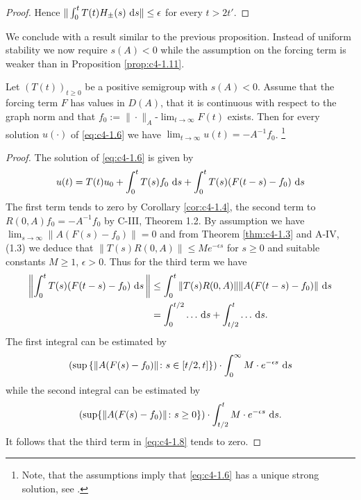 \begin{proof}
Hence $\|\int_{0}^{t} T(t)H_{\pm}(s) \, \mathop{}\!\mathrm{d}{s}\| \leq \epsilon$ for every $t > 2t'$.
\end{proof}

We conclude with a result similar to the previous proposition.
Instead of uniform stability we now require $s(A) < 0$ while the assumption on the forcing term is weaker than in Proposition \ref{prop:c4-1.11}.

\begin{proposition}\label{prop:c4-1.12}
%
%
%
Let $(T(t))_{t \geq 0}$ be a positive semigroup with $s(A) < 0$.
Assume that the forcing term $F$ has values in $D(A)$, that it is continuous with respect to the graph norm and that $f_{0} := \|\cdot\|_{A}$-$\lim_{t \to \infty} F(t)$ exists.
Then for every solution $u(\cdot)$ of \eqref{eq:c4-1.6} we have $\lim_{t \to \infty} u(t) = -A^{-1}f_{0}$.
\footnote{Note, that the assumptions imply that \eqref{eq:c4-1.6} has a unique strong solution, see \citet[ Theorem~4.2.4]{pazy:1983}.}
\end{proposition}
\begin{proof}
The solution of \eqref{eq:c4-1.6} is given by
\begin{equation}\label{eq:c4-1.8}
u(t) = T(t)u_{0} + \int_{0}^{t} T(s)f_{0} \, \mathop{}\!\mathrm{d}{s} + \int_{0}^{t} T(s)(F(t-s)-f_{0}) \, \mathop{}\!\mathrm{d}{s}
\end{equation}
The first term tends to zero by Corollary \ref{cor:c4-1.4},  
the second term to $R(0,A)f_{0} = -A^{-1}f_{0}$ by C-III, Theorem 1.2.
By assumption we have $\lim_{s \to \infty}\|A(F(s)-f_{0})\| = 0$ and from Theorem \ref{thm:c4-1.3} and A-IV, (1.3) we deduce that $\|T(s)R(0,A)\| \leq Me^{-\epsilon s}$ for $s \geq 0$ and suitable constants $M \geq 1$, $\epsilon > 0$.
Thus for the third term we have
\begin{align*}
 \left\|\int_{0}^{t} T(s)(F(t-s)-f_{0}) \, \mathop{}\!\mathrm{d}{s}\,\right\| &\leq \int_{0}^{t} \|T(s)R(0,A)\| \|A(F(t-s)-f_{0})\| \, \mathop{}\!\mathrm{d}{s} \\
&= \int_{0}^{t/2} \ldots \, \mathop{}\!\mathrm{d}{s} + \int_{t/2}^{t} \ldots \, \mathop{}\!\mathrm{d}{s}.
\end{align*}
The first integral can be estimated by
\[
 \left(\sup  \left\{\|A(F(s)-f_{0})\| \colon s \in 
 \left[ t/2 , t \right] \right\} \right) 
\cdot \int_{0}^{\infty} M \cdot e^{-\epsilon s} \, \mathop{}\!\mathrm{d}{s}
\]
while the second integral can be estimated by 
\[
 \left(\sup\{\|A(F(s)-f_{0})\| \colon s \geq 0\}\right)
\cdot \int_{t/2}^{t} M \cdot e^{- \epsilon s} \, \mathop{}\!\mathrm{d}{s}.
\]
It follows that the third term in \eqref{eq:c4-1.8} tends to zero.
\end{proof}
\clearpage
